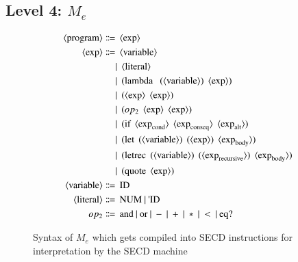 \documentclass[a4paper,12pt,twoside,openright]{report}
\theoremstyle{definition}
\newcommand{\ts}{\textquotesingle}
\newcommand{\mevl}{$M_{e}$}
\begin{document}
\subsection{Level 4: \texorpdfstring{\mevl}{Lg}}\label{subsec:mevl}
\begin{figure}[ht!]
\begin{align*}
	\langle \text{program} \rangle \Coloneqq & \:\: \langle \text{exp} \rangle \\
	\langle \text{exp} \rangle \Coloneqq & \:\: \langle \text{variable} \rangle \\
															   & | \:\: \langle \text{literal} \rangle \\
															   & | \:\: \text{(lambda \: (} \langle \text{variable} \rangle\text{)} \:\: \langle \text{exp} \rangle\text{)} \\
															   & | \:\: \text{(} \langle \text{exp} \rangle \:\: \langle \text{exp} \rangle \text{)} \\
															   & | \:\: \text{(} op_{2} \:\: \langle \text{exp} \rangle \:\: \langle \text{exp} \rangle \text{)} \\
															   & | \:\: \text{(if} \:\: \langle \text{exp}_\text{cond} \rangle \:\: \langle \text{exp}_\text{conseq} \rangle \:\: \langle \text{exp}_\text{alt} \rangle \text{)} \\
															   & | \:\: \text{(let} \:\: \text{(} \langle \text{variable} \rangle \text{)} \:\: \text{(}\langle \text{exp} \rangle \text{)} \:\: \langle \text{exp}_\text{body} \rangle \text{)} \\
															   & | \:\: \text{(letrec} \:\: \text{(} \langle \text{variable} \rangle \text{)} \:\: \text{(}\langle \text{exp}_\text{recursive} \rangle \text{)} \:\: \langle \text{exp}_\text{body} \rangle \text{)} \\
															   & | \:\: \text{(quote} \:\: \langle \text{exp} \rangle \text{)} \\
	\langle \text{variable} \rangle \Coloneqq & \:\: \text{ID} \\
	\langle \text{literal} \rangle \Coloneqq & \:\: \text{NUM} \: | \: \text{{\ts}ID} \\
	op_{2} \Coloneqq & \:\: \text{and} \: | \: \text{or} \: | \: - \: | \: + \: | \: * \: | \: < \: | \: \text{eq?}
\end{align*}
\caption{Syntax of \mevl{} which gets compiled into SECD instructions for interpretation by the SECD machine}
\label{fig:mevl_syntax}
\end{figure}
\end{document}
